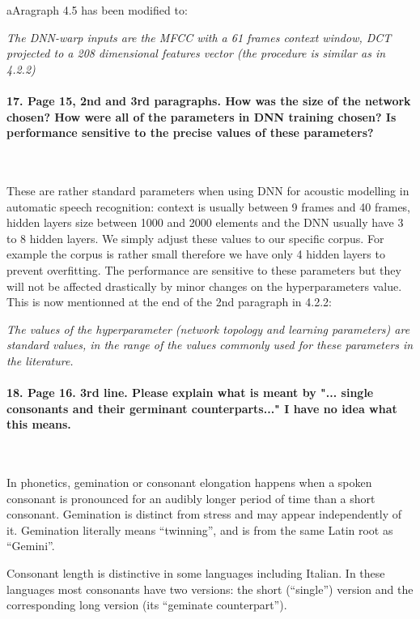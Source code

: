 \documentclass[]{article}
\begin{document}
aAragraph 4.5 has been modified to:

\textit{The DNN-warp inputs are the MFCC with a 61 frames context window, DCT projected to a 208 dimensional features vector (the procedure is similar as in 4.2.2)}

\paragraph{17. Page 15, 2nd and 3rd paragraphs. How was the size of the network chosen? How were all of the parameters in DNN training chosen? Is performance sensitive to the precise values of these parameters?}

~

These are rather standard parameters when using DNN for acoustic modelling in automatic speech recognition: context is usually between 9 frames and 40 frames, hidden layers size between 1000 and 2000 elements and the DNN usually have 3 to 8 hidden layers. We simply adjust these values to our specific corpus. For example the corpus is rather small therefore we have only 4 hidden layers to prevent overfitting. The performance are sensitive to these parameters but they will not be affected drastically by minor changes on the hyperparameters value. This is now mentionned at the end of the 2nd paragraph in 4.2.2:

\textit{The values of the hyperparameter (network topology and learning parameters) are standard values, in the range of the values commonly used for these parameters in the literature.} 

\paragraph{18. Page 16. 3rd line. Please explain what is meant by "... single consonants and their germinant counterparts..." I have no idea what this means.}

~

In phonetics, gemination or consonant elongation happens when a spoken
consonant is  pronounced for an audibly  longer period of  time than a
short  consonant. Gemination is  distinct from  stress and  may appear
independently of  it. Gemination literally means  ``twinning'', and is
from the same Latin root as ``Gemini''.

Consonant length  is distinctive in some  languages including Italian.
In  these  languages most  consonants  have  two  versions: the  short
(``single'') version  and the corresponding long  version (its ``geminate                                                 
counterpart'').
\end{document}
